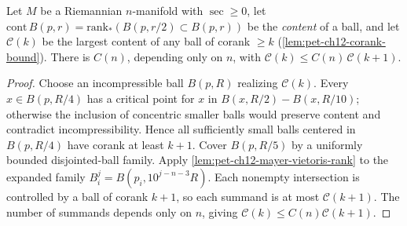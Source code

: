 \begin{lemma}
  \label{lem:pet-ch12-content-ratio-bound}

  Let $M$ be a Riemannian $n$-manifold with $\sec\ge0$, let
  $\mathrm{cont}\,B(p,r)=\mathrm{rank}_*(B(p,r/2)\subset B(p,r))$ be the
  \emph{content} of a ball, and let $\mathcal{C}(k)$ be the largest content of
  any ball of corank $\ge k$ (\cref{lem:pet-ch12-corank-bound}). There is
  $C(n)$, depending only on $n$, with $\mathcal{C}(k)\le
  C(n)\,\mathcal{C}(k+1)$.
\end{lemma}
\begin{proof}
  \sketch
  Choose an incompressible ball \(B(p,R)\) realizing \(\mathcal C(k)\). Every
  \(x\in B(p,R/4)\) has a critical point for \(x\) in
  \(B(x,R/2)-B(x,R/10)\); otherwise the inclusion of concentric smaller
  balls would preserve content and contradict incompressibility. Hence all
  sufficiently small balls centered in \(B(p,R/4)\) have corank at least
  \(k+1\). Cover \(B(p,R/5)\) by a uniformly bounded disjointed-ball
  family. Apply \cref{lem:pet-ch12-mayer-vietoris-rank} to the expanded family
  \(B_i^j=B(p_i,10^{j-n-3}R)\). Each nonempty intersection is controlled by a
  ball of corank \(k+1\), so each summand is at most \(\mathcal C(k+1)\).
  The number of summands depends only on \(n\), giving
  \(\mathcal C(k)\le C(n)\mathcal C(k+1)\).
\end{proof}

